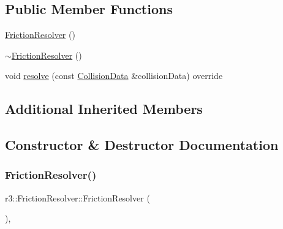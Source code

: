 \subsection*{Public Member Functions}
\begin{DoxyCompactItemize}
\item 
\mbox{\hyperlink{classr3_1_1_friction_resolver_a55a3a08603cf362da1896ec2ccc026ba}{Friction\+Resolver}} ()
\item 
\mbox{\hyperlink{classr3_1_1_friction_resolver_a49a41d6820e9c9c17447c79303296dea}{$\sim$\+Friction\+Resolver}} ()
\item 
void \mbox{\hyperlink{classr3_1_1_friction_resolver_aa6c4e02ba5ec9759eea10900cdcf44f5}{resolve}} (const \mbox{\hyperlink{classr3_1_1_collision_data}{Collision\+Data}} \&collision\+Data) override
\end{DoxyCompactItemize}
\subsection*{Additional Inherited Members}


\subsection{Constructor \& Destructor Documentation}
\mbox{\label{classr3_1_1_friction_resolver_a55a3a08603cf362da1896ec2ccc026ba}} 
\subsubsection{\texorpdfstring{Friction\+Resolver()}{FrictionResolver()}}
{\footnotesize\ttfamily r3\+::\+Friction\+Resolver\+::\+Friction\+Resolver (\begin{DoxyParamCaption}{ }\end{DoxyParamCaption})\hspace{0.3cm}{\ttfamily [explicit]}, {\ttfamily [default]}}

\mbox{\label{classr3_1_1_friction_resolver_a49a41d6820e9c9c17447c79303296dea}} 
